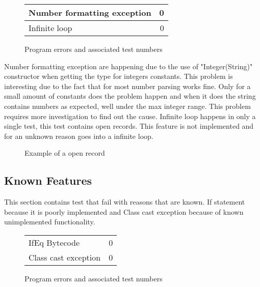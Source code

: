 \begin{figure}[H]
  \centering
  \begin{tabular}{| l || r |}
  \hline
  Number formatting exception & 0 \\ \hline
  Infinite loop & 0\\ \hline
  \hline
  \end{tabular}
  \caption{Program errors and associated test numbers}
  \label{fig:table2}
\end{figure}

Number formatting exception are happening due to the use of "Integer(String)" constructor when getting the type for integers constants. This problem is interesting due to the fact that for most number parsing works fine. Only for a small amount of constants does the problem happen and when it does the string contains numbers as expected, well under the max integer range. This problem requires more investigation to find out the cause.%
Infinite loop happens in only a single test, this test contains open records. This feature is not implemented and for an unknown reason goes into a infinite loop.

\begin{figure}[H]
  \centering
  \caption{Example of a open record}
  \label{fig:table2}
\end{figure}

\subsection{Known Features}
This section contains test that fail with reasons that are known. If statement because it is poorly implemented and Class cast exception because of known unimplemented functionality.

\begin{figure}[H]
  \centering
  \begin{tabular}{| l || r |}
  \hline
  IfEq Bytecode & 0 \\
  Class cast exception & 0 \\ \hline 
  \hline
  \end{tabular}
  \caption{Program errors and associated test numbers}
  \label{fig:table2}
\end{figure}

